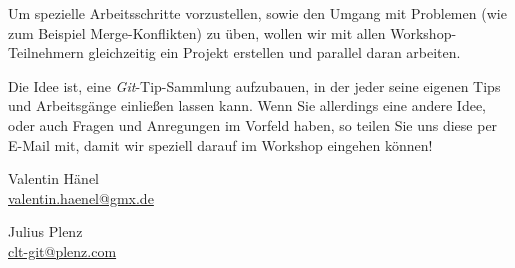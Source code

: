 \documentclass[11pt,            %
               a4paper,         %
               oneside,         %
               DIV14,           %
               fleqn,           %
               smallheadings,   %
               halfparskip,     %
               nochapterprefix, %
               bibtotocnumbered,%
              ]{scrartcl} %
\begin{document}
Um spezielle Arbeitsschritte vorzustellen, sowie den Umgang mit
Problemen (wie zum Beispiel Merge-Konflikten) zu üben, wollen wir mit allen
Workshop-Teilnehmern gleichzeitig ein Projekt erstellen und parallel
daran arbeiten.

Die Idee ist, eine \emph{Git}-Tip-Sammlung aufzubauen, in der jeder
seine eigenen Tips und Arbeitsgänge einließen lassen kann.
Wenn Sie allerdings eine andere Idee, oder auch Fragen und Anregungen
im Vorfeld haben, so teilen Sie uns diese per E-Mail mit, damit wir
speziell darauf im Workshop eingehen können!

\hfill
\begin{minipage}{6cm}
\begin{center}
Valentin Hänel\\
\url{valentin.haenel@gmx.de}
\end{center}
\end{minipage}
\hfill
\begin{minipage}{6cm}
\begin{center}
Julius Plenz\\
\url{clt-git@plenz.com}
\end{center}
\end{minipage}
\hfill\\







%
%
\end{document}

